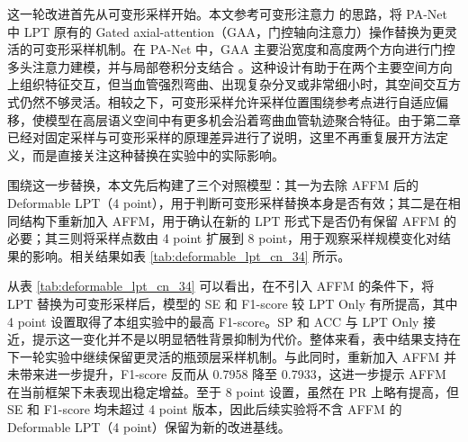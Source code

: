 \documentclass[a4paper,12pt]{article}
\begin{document}
这一轮改进首先从可变形采样开始。本文参考可变形注意力 \cite{zhu2021deformabledetr} 的思路，将 PA-Net 中 LPT 原有的 Gated axial-attention（GAA，门控轴向注意力）操作替换为更灵活的可变形采样机制。在 PA-Net 中，GAA 主要沿宽度和高度两个方向进行门控多头注意力建模，并与局部卷积分支结合 \cite{luo2025panet}。这种设计有助于在两个主要空间方向上组织特征交互，但当血管强烈弯曲、出现复杂分叉或非常细小时，其空间交互方式仍然不够灵活。相较之下，可变形采样允许采样位置围绕参考点进行自适应偏移，使模型在高层语义空间中有更多机会沿着弯曲血管轨迹聚合特征。由于第二章已经对固定采样与可变形采样的原理差异进行了说明，这里不再重复展开方法定义，而是直接关注这种替换在实验中的实际影响。

围绕这一步替换，本文先后构建了三个对照模型：其一为去除 AFFM 后的 Deformable LPT（4 point），用于判断可变形采样替换本身是否有效；其二是在相同结构下重新加入 AFFM，用于确认在新的 LPT 形式下是否仍有保留 AFFM 的必要；其三则将采样点数由 4 point 扩展到 8 point，用于观察采样规模变化对结果的影响。相关结果如表 \ref{tab:deformable_lpt_cn_34} 所示。

\begin{table}[htbp]
\centering
\caption{可变形 LPT 相关实验结果对比}
\label{tab:deformable_lpt_cn_34}
\end{table}

从表 \ref{tab:deformable_lpt_cn_34} 可以看出，在不引入 AFFM 的条件下，将 LPT 替换为可变形采样后，模型的 SE 和 F1-score 较 LPT Only 有所提高，其中 4 point 设置取得了本组实验中的最高 F1-score。SP 和 ACC 与 LPT Only 接近，提示这一变化并不是以明显牺牲背景抑制为代价。整体来看，表中结果支持在下一轮实验中继续保留更灵活的瓶颈层采样机制。与此同时，重新加入 AFFM 并未带来进一步提升，F1-score 反而从 0.7958 降至 0.7933，这进一步提示 AFFM 在当前框架下未表现出稳定增益。至于 8 point 设置，虽然在 PR 上略有提高，但 SE 和 F1-score 均未超过 4 point 版本，因此后续实验将不含 AFFM 的 Deformable LPT（4 point）保留为新的改进基线。
\end{document}
